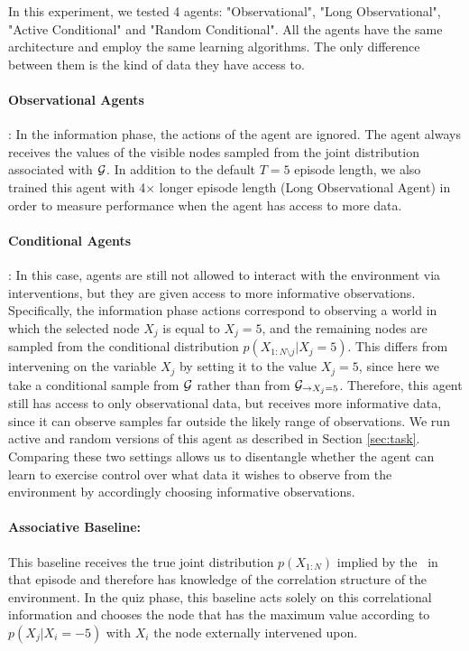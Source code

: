 In this experiment, we tested 4 agents: "Observational", "Long Observational", "Active Conditional" and "Random Conditional". All the agents have the same architecture and employ the same learning algorithms. The only difference between them is the kind of data they have access to.

\paragraph{Observational Agents}: In the information phase, the actions of the agent are ignored.
The agent always receives the values of the visible nodes sampled from the joint distribution associated with ${\cal G}$. In addition to the default $T=5$ episode length, we also trained this agent with 4$\times$ longer episode length (Long Observational Agent) in order to measure performance when the agent has access to more data.

\paragraph{Conditional Agents}:
In this case, agents are still not allowed to interact with the environment via interventions, but they are given access to more informative observations. Specifically, the information phase actions correspond to observing a world in which the selected node $X_j$ is equal to $X_j=5$, and the remaining nodes are sampled from the conditional distribution \(p(X_{1:N\setminus j }|X_j=5)\).
This differs from intervening on the variable $X_{j}$ by setting it to the value $X_{j}=5$, since here we take a conditional sample from ${\cal G}$ rather than from ${\cal G}_{\rightarrow X_j=5}$. %
Therefore, this agent still has access to only observational data, but receives more informative data, since it can observe samples far outside the likely range of observations. We run active and random versions of this agent as described in Section \ref{sec:task}. Comparing these two settings allows us to disentangle whether the agent can learn to exercise control over what data it wishes to observe from the environment by accordingly choosing informative observations.

\paragraph{Associative Baseline:}
This baseline receives the true joint distribution $p(X_{1:N})$ implied by the \CBN~in that episode and therefore has knowledge of the correlation structure of the environment. In the quiz phase, this baseline acts solely on this correlational information and chooses the node that has the maximum value according to $p(X_j|X_i=-5)$ with $X_i$ the node externally intervened upon.

